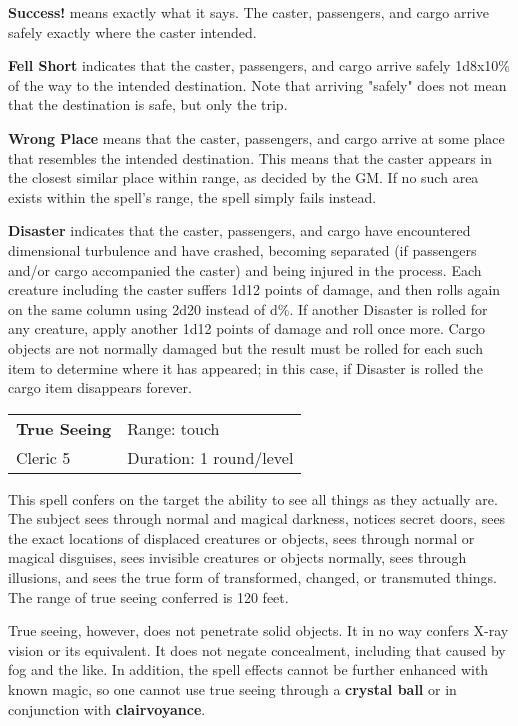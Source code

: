 \documentclass[a4paper,twoside,openany,10pt]{book}
\begin{document}
\begin{multicols}{2}
\textbf{Success!} means exactly what it says. The caster, passengers, and cargo arrive safely exactly where the caster intended.

\textbf{Fell Short }indicates that the caster, passengers, and cargo arrive safely 1d8x10\% of the way to the intended destination. Note that arriving "safely" does not mean that the destination is safe, but only the trip.

\textbf{Wrong Place }means that the caster, passengers, and cargo arrive at some place that resembles the intended destination. This means that the caster appears in the closest similar place within range, as decided by the GM. If no such area exists within the spell's range, the spell simply fails instead.

\textbf{Disaster} indicates that the caster, passengers, and cargo have encountered dimensional turbulence and have crashed, becoming separated (if passengers and/or cargo accompanied the caster) and being injured in the process. Each creature including the caster suffers 1d12 points of damage, and then rolls again on the same column using 2d20 instead of d\%. If another Disaster is rolled for any creature, apply another 1d12 points of damage and roll once more. Cargo objects are not normally damaged but the result must be rolled for each such item to determine where it has appeared; in this case, if Disaster is rolled the cargo item disappears forever.


\smallskip\begin{flushleft} 
	\begin{tabularx}{0.45\textwidth}{@{}m{3.5cm}m{5.5cm}@{}} 
		\textbf{True Seeing} & Range: touch\\
		Cleric 5 & Duration:  1 round/level\\
	\end{tabularx}\end{flushleft}

This spell confers on the target the ability to see all things as they actually are. The subject sees through normal and magical darkness, notices secret doors, sees the exact locations of displaced creatures or objects, sees through normal or magical disguises, sees invisible creatures or objects normally, sees through illusions, and sees the true form of transformed, changed, or transmuted things. The range of true seeing conferred is 120 feet.

True seeing, however, does not penetrate solid objects. It in no way confers X-ray vision or its equivalent. It does not negate concealment, including that caused by fog and the like. In addition, the spell effects cannot be further enhanced with known magic, so one cannot use true seeing through a \textbf{crystal ball} or in conjunction with \textbf{clairvoyance}.



\end{multicols}
\end{document}
